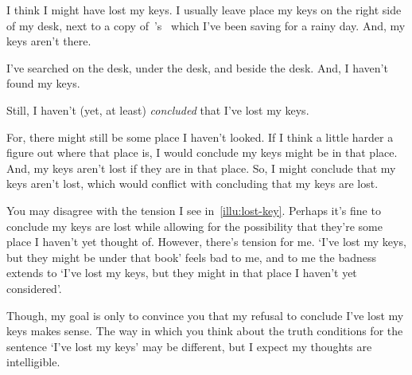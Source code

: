 \begin{note}
  \begin{scenario}
    \label{illu:lost-key}
    I think I might have lost my keys.
    I usually leave place my keys on the right side of my desk, next to a copy of~\citeauthor{Vickers:1989tr}'s~ which I've been saving for a rainy day.
    And, my keys aren't there.

    I've searched on the desk, under the desk, and beside the desk.
    And, I haven't found my keys.

    Still, I haven't (yet, at least) \emph{concluded} that I've lost my keys.

    For, there might still be some place I haven't looked.
    If I think a little harder a figure out where that place is, I would conclude my keys might be in that place.
    And, my keys aren't lost if they are in that place.
    So, I might conclude that my keys aren't lost, which would conflict with concluding that my keys are lost.
  \end{scenario}

  You may disagree with the tension I see in~\autoref{illu:lost-key}.
  Perhaps it's fine to conclude my keys are lost while allowing for the possibility that they're some place I haven't yet thought of.
  However, there's tension for me.
  `I've lost my keys, but they might be under that book' feels bad to me, and to me the badness extends to `I've lost my keys, but they might in that place I haven't yet considered'.

  Though, my goal is only to convince you that my refusal to conclude I've lost my keys makes sense.
  The way in which you think about the truth conditions for the sentence `I've lost my keys' may be different, but I expect my thoughts are intelligible.
\end{note}

